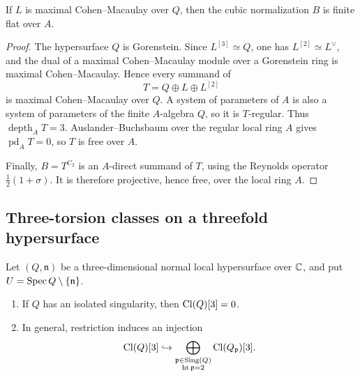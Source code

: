 \begin{proposition}
\label{prop:resolvent-mcm-criterion}
If \(L\) is maximal Cohen--Macaulay over \(Q\), then the cubic normalization
\(B\) is finite flat over \(A\).
\end{proposition}

\begin{proof}
The hypersurface \(Q\) is Gorenstein.  Since \(L^{[3]}\simeq Q\), one has
\(L^{[2]}\simeq L^\vee\), and the dual of a maximal Cohen--Macaulay module
over a Gorenstein ring is maximal Cohen--Macaulay.  Hence every summand of
\[
T=Q\oplus L\oplus L^{[2]}
\]
is maximal Cohen--Macaulay over \(Q\).  A system of parameters of \(A\) is
also a system of parameters of the finite \(A\)-algebra \(Q\), so it is
\(T\)-regular.  Thus \(\operatorname{depth}_A T=3\).  Auslander--Buchsbaum
over the regular local ring \(A\) gives \(\operatorname{pd}_A T=0\), so
\(T\) is free over \(A\).

Finally, \(B=T^{C_2}\) is an \(A\)-direct summand of \(T\), using the Reynolds
operator \(\frac12(1+\sigma)\).  It is therefore projective, hence free, over
the local ring \(A\).
\end{proof}

\subsection{Three-torsion classes on a threefold hypersurface}

\begin{theorem}
\label{thm:dao-codim-two}
Let \((Q,\mathfrak n)\) be a three-dimensional normal local hypersurface over
\(\mathbb C\), and put \(U=\operatorname{Spec} Q\setminus\{\mathfrak n\}\).
\begin{enumerate}[label=(\roman*)]
\item If \(Q\) has an isolated singularity, then \(\operatorname{Cl}(Q)[3]=0\).
\item In general, restriction induces an injection
\[
\operatorname{Cl}(Q)[3]\hookrightarrow
\bigoplus_{\substack{\mathfrak p\in\operatorname{Sing}(Q)\\\operatorname{ht}\mathfrak p=2}}
\operatorname{Cl}(Q_{\mathfrak p})[3].
\]
\end{enumerate}
\end{theorem}

